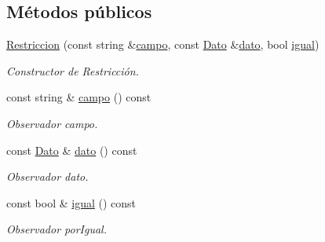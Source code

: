 \subsection*{Métodos públicos}
\begin{DoxyCompactItemize}
\item 
\hyperlink{classRestriccion_a6a2bb9363d1083319784caec16d9c47f}{Restriccion} (const string \&\hyperlink{classRestriccion_abee29e2435df3c0c2c8dd6330c7ad174}{campo}, const \hyperlink{classDato}{Dato} \&\hyperlink{classRestriccion_ac9b624d6ed5510aabb52ff68b77ce2f2}{dato}, bool \hyperlink{classRestriccion_ad1a9be4996f3ab4d9a26853c0b96f387}{igual})
\begin{DoxyCompactList}\small\item\em Constructor de Restricción. \end{DoxyCompactList}\item 
const string \& \hyperlink{classRestriccion_abee29e2435df3c0c2c8dd6330c7ad174}{campo} () const 
\begin{DoxyCompactList}\small\item\em Observador campo. \end{DoxyCompactList}\item 
const \hyperlink{classDato}{Dato} \& \hyperlink{classRestriccion_ac9b624d6ed5510aabb52ff68b77ce2f2}{dato} () const 
\begin{DoxyCompactList}\small\item\em Observador dato. \end{DoxyCompactList}\item 
const bool \& \hyperlink{classRestriccion_ad1a9be4996f3ab4d9a26853c0b96f387}{igual} () const 
\begin{DoxyCompactList}\small\item\em Observador por\-Igual. \end{DoxyCompactList}\end{DoxyCompactItemize}
